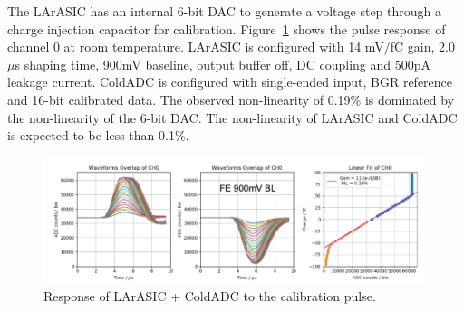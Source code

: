 \label{sec:4.4}
The LArASIC has an internal 6-bit DAC to generate a voltage step through a charge injection 
capacitor for calibration. Figure~\ref{fig:calibpulse} shows the pulse response of channel 0 at 
room temperature.  LArASIC is configured with 14 mV/fC gain, 2.0 $\mu$s shaping time, 
900mV baseline, output buffer off, DC coupling and 500pA leakage current. ColdADC is configured 
with single-ended input, BGR reference and 16-bit calibrated data. The observed non-linearity of 
0.19\% is dominated by the non-linearity of the 6-bit DAC. The non-linearity of LArASIC and 
ColdADC is expected to be less than 0.1\%.   
\begin{figure}[h!]
\centering
  \includegraphics[width=1.0\linewidth]{figures/calibpulse.png}
  \caption{Response of LArASIC + ColdADC to the calibration pulse.}
  \label{fig:calibpulse}
\end{figure}

